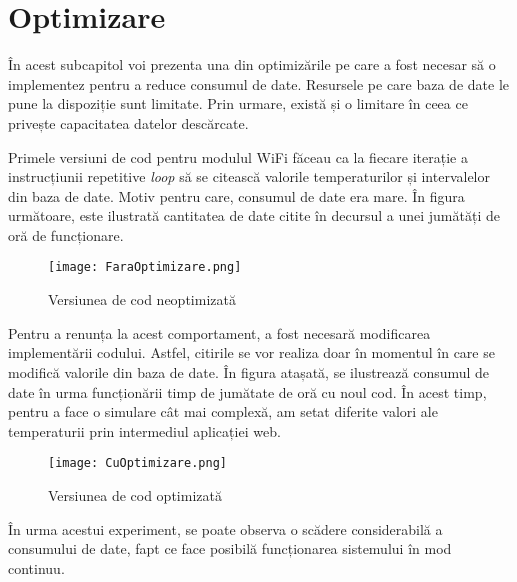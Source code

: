 \section{Optimizare}

	În acest subcapitol voi prezenta una din optimizările pe care a fost necesar să o implementez pentru a reduce consumul de date. Resursele pe care baza de date le pune la dispoziție sunt limitate. Prin urmare, există și o limitare în ceea ce privește capacitatea datelor descărcate.

	Primele versiuni de cod pentru modulul WiFi făceau ca la fiecare iterație a instrucțiunii repetitive \textit{loop} să se citească valorile temperaturilor și intervalelor din baza de date. Motiv pentru care, consumul de date era mare.  În figura următoare, este ilustrată cantitatea de date citite în decursul a unei jumătăți de oră de funcționare.
 
\begin{figure}[H]
   	\centering
    	\texttt{[image: FaraOptimizare.png]}
	\caption{Versiunea de cod neoptimizată}
\end{figure}

	Pentru a renunța la acest comportament, a fost necesară modificarea implementării codului. Astfel, citirile se vor realiza doar în momentul în care se modifică valorile din baza de date. În figura atașată, se ilustrează consumul de date în urma funcționării timp de jumătate de oră cu noul cod. În acest timp, pentru a face o simulare cât mai complexă, am setat diferite valori ale temperaturii prin intermediul aplicației web. 

\begin{figure}[H]
   	\centering
    	\texttt{[image: CuOptimizare.png]}
	\caption{Versiunea de cod optimizată}
\end{figure}

	În urma acestui experiment, se poate observa o scădere considerabilă a consumului de date, fapt ce face posibilă funcționarea sistemului în mod continuu. 

